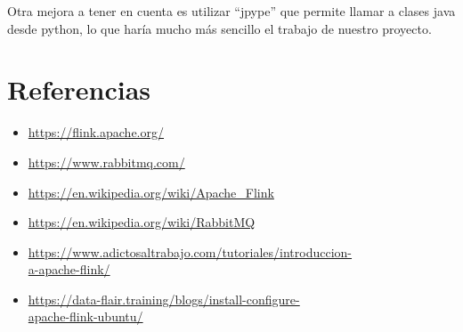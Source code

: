\documentclass[12pt,letterpaper]{article}
\begin{document}
Otra mejora a tener en cuenta es utilizar ``jpype'' que permite llamar a clases java desde python, lo que haría mucho más sencillo el trabajo de nuestro proyecto.

\section{Referencias}
\begin{itemize}
	\item \url{https://flink.apache.org/}
	\item \url{https://www.rabbitmq.com/}
	\item \url{https://en.wikipedia.org/wiki/Apache_Flink}
	\item \url{https://en.wikipedia.org/wiki/RabbitMQ}
	\item \url{https://www.adictosaltrabajo.com/tutoriales/introduccion-}\\\url{a-apache-flink/}
	\item \url{https://data-flair.training/blogs/install-configure-}\\\url{apache-flink-ubuntu/}
\end{itemize}
\end{document}
